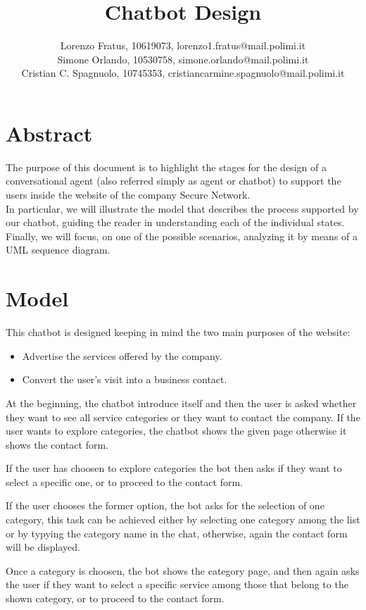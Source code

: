 \documentclass[12pt]{report}
\title{Chatbot Design}
\author{Lorenzo Fratus, 10619073, lorenzo1.fratus@mail.polimi.it \\
Simone Orlando, 10530758, simone.orlando@mail.polimi.it \\
Cristian C. Spagnuolo, 10745353, cristiancarmine.spagnuolo@mail.polimi.it}
\begin{document}
\maketitle
\tableofcontents

\chapter{Abstract}
The purpose of this document is to highlight the stages for the 
design of a conversational agent (also referred simply as agent or chatbot) to support 
the users inside the website of the company Secure Network.\\
In particular, we will illustrate the model that describes the process
supported by our chatbot, guiding the reader in understanding each of
the individual states.\\
Finally, we will focus, on one of the possible scenarios, analyzing
it by means of a UML sequence diagram.

\chapter{Model}
This chatbot is designed keeping in mind the two main purposes of the
website:
\begin{itemize}
	\item Advertise the services offered by the company.
	\item Convert the user's visit into a business contact. 
\end{itemize}
\bigbreak
\noindent
At the beginning, the chatbot introduce itself and then the user is asked whether they want to see all service categories or they want to contact the company.
If the user wants to explore categories, the chatbot shows the given page otherwise it shows the contact form.

\bigbreak
\noindent
If the user has choosen to explore categories the bot then asks if they want to select a specific one, or to proceed to the contact form.

\bigbreak
\noindent
If the user chooses the former option, the bot asks for the selection of one category, this task can be achieved either by selecting one category among the list 
or by typying the category name in the chat, otherwise, again the contact form will be displayed.

\bigbreak
\noindent
Once a category is choosen, the bot shows the category page, and then again asks the user if they want to select a specific service among those that belong to the 
shown category, or to proceed to the contact form.
\end{document}
